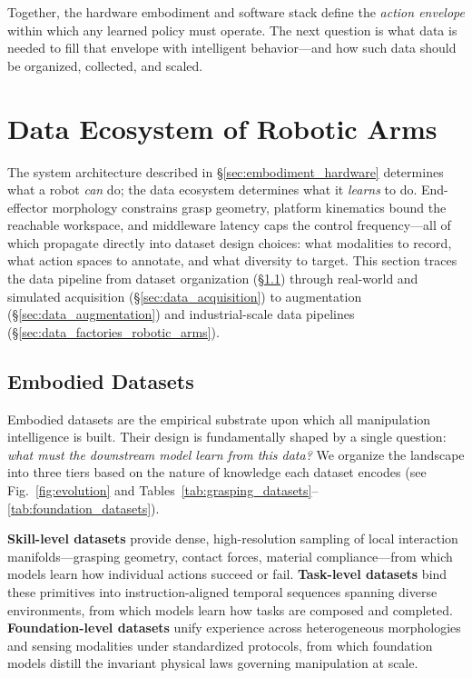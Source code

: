 \documentclass[acmsmall,screen,review,anonymous]{acmart}
\begin{document}
Together, the hardware embodiment and software stack define the \emph{action envelope} within which any learned policy must operate. The next question is what data is needed to fill that envelope with intelligent behavior---and how such data should be organized, collected, and scaled.

\section{Data Ecosystem of Robotic Arms}\label{sec:embodiment_dataset}

The system architecture described in \S\ref{sec:embodiment_hardware} determines what a robot \emph{can} do; the data ecosystem determines what it \emph{learns} to do. End-effector morphology constrains grasp geometry, platform kinematics bound the reachable workspace, and middleware latency caps the control frequency---all of which propagate directly into dataset design choices: what modalities to record, what action spaces to annotate, and what diversity to target. This section traces the data pipeline from dataset organization (\S\ref{sec:eai_datasets}) through real-world and simulated acquisition (\S\ref{sec:data_acquisition}) to augmentation (\S\ref{sec:data_augmentation}) and industrial-scale data pipelines (\S\ref{sec:data_factories_robotic_arms}).

\subsection{Embodied Datasets}\label{sec:eai_datasets}

Embodied datasets are the empirical substrate upon which all manipulation intelligence is built. Their design is fundamentally shaped by a single question: \emph{what must the downstream model learn from this data?} We organize the landscape into three tiers based on the nature of knowledge each dataset encodes (see Fig.~\ref{fig:evolution} and Tables~\ref{tab:grasping_datasets}--\ref{tab:foundation_datasets}).

\textbf{Skill-level datasets} provide dense, high-resolution sampling of local interaction manifolds---grasping geometry, contact forces, material compliance---from which models learn how individual actions succeed or fail. \textbf{Task-level datasets} bind these primitives into instruction-aligned temporal sequences spanning diverse environments, from which models learn how tasks are composed and completed. \textbf{Foundation-level datasets} unify experience across heterogeneous morphologies and sensing modalities under standardized protocols, from which foundation models distill the invariant physical laws governing manipulation at scale.
\end{document}
